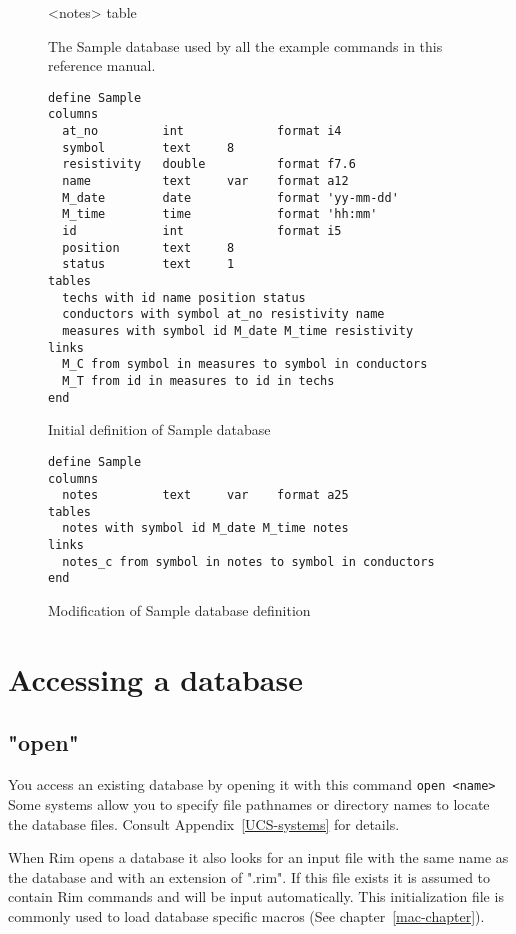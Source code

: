\documentclass[11pt,a4paper]{report}
\def\I{\index}
\begin{document}
\begin{figure}[htp]
\begin{center}
  \smallskip
          {<notes> table }
\end{center}
\caption[The Sample database]
  {The Sample database used by all the example commands
   in this reference manual.}
\label{Sample}
\end{figure}
 
 
 
\begin{figure}[htp]
\begin{verbatim}
define Sample
columns
  at_no         int             format i4
  symbol        text     8
  resistivity   double          format f7.6
  name          text     var    format a12
  M_date        date            format 'yy-mm-dd'
  M_time        time            format 'hh:mm'
  id            int             format i5
  position      text     8
  status        text     1
tables
  techs with id name position status
  conductors with symbol at_no resistivity name
  measures with symbol id M_date M_time resistivity
links
  M_C from symbol in measures to symbol in conductors
  M_T from id in measures to id in techs
end
\end{verbatim}
\caption{Initial definition of Sample database}
\label{Sample-def1}
\end{figure}
 
 
\begin{figure}[htp]
\begin{verbatim}
define Sample
columns
  notes         text     var    format a25
tables
  notes with symbol id M_date M_time notes
links
  notes_c from symbol in notes to symbol in conductors
end
\end{verbatim}
\caption{Modification of Sample database definition}
\label{Sample-def2}
\end{figure}
 
\section{Accessing a database}
%
\I{open@"open"}
\subsection{"open"}
You access an existing database by opening it with this command
\verb|open <name>|
Some systems allow you to specify file pathnames or
directory names to locate the database files.
Consult Appendix~\ref{UCS-systems} for details.
 
When Rim opens a database it also looks for an input
file with the same name as the database and with an extension
of ".rim".  If this file exists it is assumed to contain
Rim commands and will be input automatically.
\I{initialization}
This initialization file is commonly used to load
database specific macros (See chapter~\ref{mac-chapter}).
 
\end{document}
